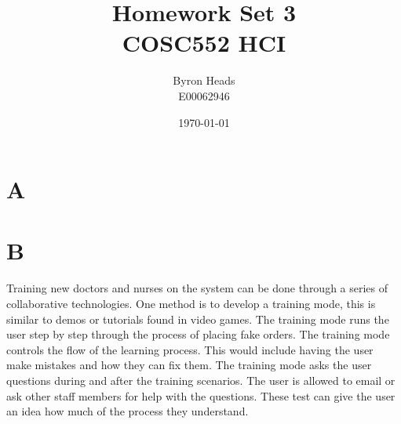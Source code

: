 \documentclass[12pt]{article}
\title{Homework Set 3 \\
    COSC552 HCI}
\author{ Byron Heads \\
    E00062946 }
\date{\today}
\begin{document}
\maketitle

\section*{A}

\section*{B}

Training new doctors and nurses on the system can be done through a series of collaborative technologies.  One method is to develop a training mode, this is similar to demos or tutorials found in video games.  The training mode runs the user step by step through the process of placing fake orders.  The training mode controls the flow of the learning process.  This would include having the user make mistakes and how they can fix them.  The training mode asks the user questions during and after the training scenarios.  The user is allowed to email or ask other staff members for help with the questions.  These test can give the user an idea how much of the process they understand.
\end{document}
